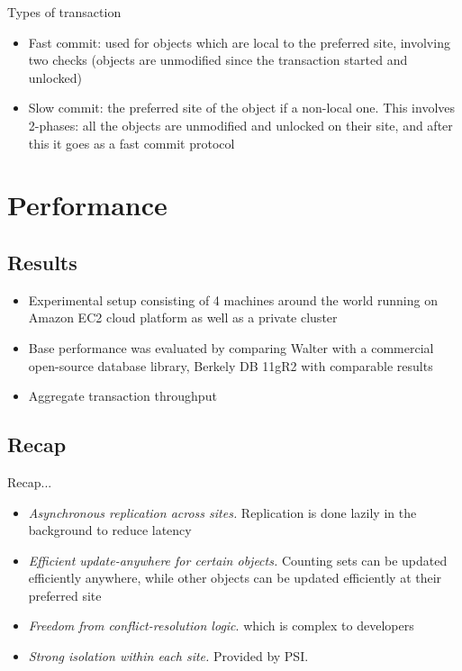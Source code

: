 \documentclass{beamer}
\begin{document}
		\begin{frame}{Types of transaction}
		
		\begin{itemize}
		
		\item Fast commit: used for objects which are local to the preferred site, involving two checks (objects are unmodified since the transaction started and unlocked)
		
		\item Slow commit: the preferred site of the object if a non-local one. This involves 2-phases: all the objects are unmodified and unlocked on their site, and after this it goes as a fast commit protocol		
		
		\end{itemize}

		\end{frame}
 	
	 	
\section{Performance}

	\subsection{Results}
	\begin{itemize}
	\item Experimental setup consisting of 4 machines around the world running on Amazon EC2 cloud platform as well as a private cluster
	\item Base performance was evaluated by comparing Walter with a commercial open-source database library, Berkely DB 11gR2 with comparable results
	\item Aggregate transaction throughput
	
	\end{itemize}
	
	\subsection{Recap}
	\begin{frame}{Recap...}
	
		\begin{itemize}
		\item \textit{Asynchronous replication across sites.} Replication is done lazily in the background to reduce latency
		\item \textit{Efficient update-anywhere for certain objects.} Counting sets can be updated efficiently anywhere, while other objects can be updated efficiently at their preferred site
		\item \textit{Freedom from conflict-resolution logic}. which is complex to developers
		\item \textit{Strong isolation within each site.} Provided by PSI.
		\end{itemize}
	\end{frame}
\end{document}
